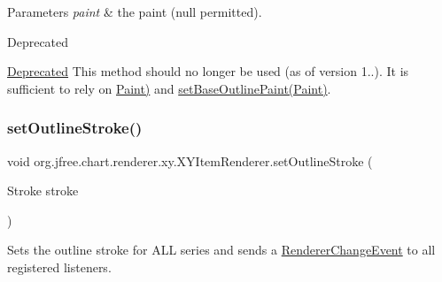 \begin{DoxyParams}{Parameters}
{\em paint} & the paint ({\ttfamily null} permitted).\\
\hline
\end{DoxyParams}
\begin{DoxyRefDesc}{Deprecated}
\item[\mbox{\hyperlink{deprecated__deprecated000220}{Deprecated}}]This method should no longer be used (as of version 1..). It is sufficient to rely on \mbox{\hyperlink{}{Paint)}} and \mbox{\hyperlink{interfaceorg_1_1jfree_1_1chart_1_1renderer_1_1xy_1_1_x_y_item_renderer_a6b3684a8366e68b2b647b43e5ef200a7}{set\+Base\+Outline\+Paint(\+Paint)}}. \end{DoxyRefDesc}
\mbox{\label{interfaceorg_1_1jfree_1_1chart_1_1renderer_1_1xy_1_1_x_y_item_renderer_ab211328ae1646de135cfaa7b88b07a0a}} 
\subsubsection{\texorpdfstring{set\+Outline\+Stroke()}{setOutlineStroke()}}
{\footnotesize\ttfamily void org.\+jfree.\+chart.\+renderer.\+xy.\+X\+Y\+Item\+Renderer.\+set\+Outline\+Stroke (\begin{DoxyParamCaption}\item[{Stroke}]{stroke }\end{DoxyParamCaption})}

Sets the outline stroke for A\+LL series and sends a \mbox{\hyperlink{}{Renderer\+Change\+Event}} to all registered listeners.


